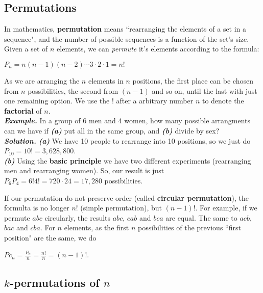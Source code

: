 \documentclass[a4paper,twocolumn]{article}
\begin{document}
\subsection{Permutations}

In mathematics, \textbf{permutation} means ``rearranging the elements of a set in a sequence", and the number of possible sequences is a function of the set's size. Given a set of $n$ elements, we can \textit{permute} it's elements according to the formula:

\begin{center}
$P_n = n(n - 1)(n - 2) \dotsm 3 \cdot 2 \cdot 1 = n!$
\end{center}

\noindent As we are arranging the $n$ elements in $n$ positions, the first place can be chosen from $n$ possibilities, the second from $(n - 1)$ and so on, until the last with just one remaining option. We use the $!$ after a arbitrary number $n$ to denote the \textbf{factorial} of $n$.\\

\noindent\textbf{\textit{Example.}} In a group of 6 men and 4 women, how many possible arrangments can we have if \textbf{\textit{(a)}} put all in the same group, and \textbf{\textit{(b)}} divide by sex?\\
\noindent\textbf{\textit{Solution.}} \textbf{\textit{(a)}} We have 10 people to rearrange into 10 positions, so we just do $P_{10} = 10! = 3,628,800$.\\
\textbf{\textit{(b)}} Using the \textbf{basic principle} we have two different experiments (rearranging men and rearranging women). So, our result is just $P_6 P_4 = 6!4! = 720 \cdot 24 = 17,280$ possibilities.

If our permutation do not preserve order (called \textbf{circular permutation}), the formulta is no longer $n!$ (simple permutation), but $(n - 1)!$. For example, if we permute $abc$ circularly, the results $abc$, $cab$ and $bca$ are equal. The same to $acb$, $bac$ and $cba$. For $n$ elements, as the first $n$ possibilities of the previous ``first position" are the same, we do

\begin{center}
$Pc_n = \frac{P_n}{n} = \frac{n!}{n} = (n - 1)!$.
\end{center}


\subsection{$k$-permutations of $n$}
\end{document}
